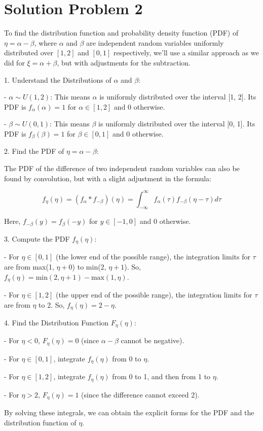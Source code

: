 \section*{Solution Problem 2}

To find the distribution function and probability density function (PDF) of \(\eta = \alpha - \beta\), where \(\alpha\) and \(\beta\) are independent random variables uniformly distributed over \([1, 2]\) and \([0, 1]\) respectively, we'll use a similar approach as we did for \(\xi = \alpha + \beta\), but with adjustments for the subtraction.

1. Understand the Distributions of \(\alpha\) and \(\beta\):

- \(\alpha \sim U(1, 2)\): This means \(\alpha\) is uniformly distributed over the interval [1, 2]. Its PDF is \(f_{\alpha}(\alpha) = 1\) for \(\alpha \in [1, 2]\) and 0 otherwise.

- \(\beta \sim U(0, 1)\): This means \(\beta\) is uniformly distributed over the interval [0, 1]. Its PDF is \(f_{\beta}(\beta) = 1\) for \(\beta \in [0, 1]\) and 0 otherwise.

2. Find the PDF of \(\eta = \alpha - \beta\):

The PDF of the difference of two independent random variables can also be found by convolution, but with a slight adjustment in the formula:

\[ f_{\eta}(\eta) = (f_{\alpha} * f_{-\beta})(\eta) = \int_{-\infty}^{\infty} f_{\alpha}(\tau)f_{-\beta}(\eta - \tau) d\tau \]

Here, \(f_{-\beta}(y) = f_{\beta}(-y)\) for \(y \in [-1, 0]\) and 0 otherwise.

3. Compute the PDF \(f_{\eta}(\eta)\):

- For \(\eta \in [0, 1]\) (the lower end of the possible range), the integration limits for \(\tau\) are from max(1, \(\eta + 0\)) to min(2, \(\eta + 1\)). So, \(f_{\eta}(\eta) = \text{min}(2, \eta + 1) - \text{max}(1, \eta)\).

- For \(\eta \in [1, 2]\) (the upper end of the possible range), the integration limits for \(\tau\) are from \(\eta\) to 2. So, \(f_{\eta}(\eta) = 2 - \eta\).

4. Find the Distribution Function \(F_{\eta}(\eta)\):

- For \(\eta < 0\), \(F_{\eta}(\eta) = 0\) (since \(\alpha - \beta\) cannot be negative).

- For \(\eta \in [0, 1]\), integrate \(f_{\eta}(\eta)\) from 0 to \(\eta\).

- For \(\eta \in [1, 2]\), integrate \(f_{\eta}(\eta)\) from 0 to 1, and then from 1 to \(\eta\).

- For \(\eta > 2\), \(F_{\eta}(\eta) = 1\) (since the difference cannot exceed 2).

By solving these integrals, we can obtain the explicit forms for the PDF and the distribution function of \(\eta\).